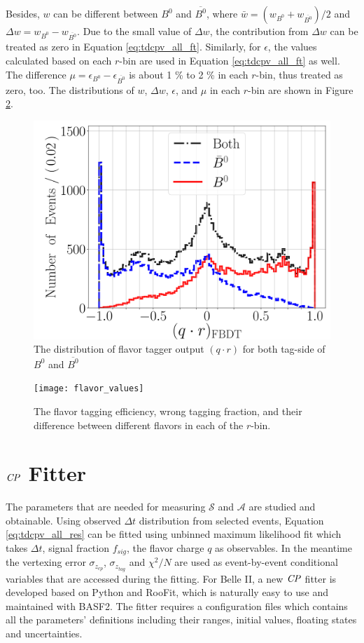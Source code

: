 Besides, $w$ can be different between $B^0$ and $\overline{B^0}$, where
$\bar{w} = (w_{B^0}+w_{\overline{B^0}})/2$ and $\Delta w = w_{B^0}-w_{\overline{B^0}}$. Due to the small value of $\Delta w$, the contribution from $\Delta w$ can be treated as zero in Equation \ref{eq:tdcpv_all_ft}. Similarly, for $\epsilon$, the values calculated based on each $r$-bin are used in Equation \ref{eq:tdcpv_all_ft} as well. The difference $\mu = \epsilon_{B^0}-\epsilon_{\overline{B^0}} $ is about 1 \% to 2 \% in each $r$-bin, thus treated as zero, too. The distributions of $w$, $\Delta w$, $\epsilon$, and $\mu$ in each $r$-bin are shown in Figure \ref{fig:ft_wtag}.
 \begin{figure}[H]
 	\centering
 	\includegraphics[width=0.7\linewidth]{figures/qr}
 	\caption{The distribution of flavor tagger output $(q\cdot r)$ for both tag-side of $B^0$ and $\overline{B^0}$}
 	\label{fig:ft_qr}
 	\end{figure}
 \begin{figure}[htpb]
 	\texttt{[image: flavor\_values]}
 	\caption{The flavor tagging efficiency, wrong tagging fraction, and their difference between different flavors in each of the $r$-bin.}
 	\label{fig:ft_wtag}
 \end{figure}

\section{$\it{CP}$ Fitter}

The parameters that are needed for measuring $\mathcal{S}$ and $\mathcal{A}$ are studied and obtainable. Using observed $\Delta t$ distribution from selected events, Equation \ref{eq:tdcpv_all_res} can be fitted using unbinned maximum likelihood fit which takes $\Delta t$, signal fraction $f_{sig}$, the flavor charge $q$ as observables. In the meantime the vertexing error $\sigma_{z_{cp}}$, $\sigma_{z_{tag}}$ and $\chi^2/N$ are used as event-by-event conditional variables that are accessed during the fitting.
For Belle II, a new $\it{CP}$ fitter is developed based on Python and RooFit, which is naturally easy to use and maintained with BASF2. The fitter requires a configuration files which contains all the parameters' definitions including their ranges, initial values, floating states and uncertainties. 

